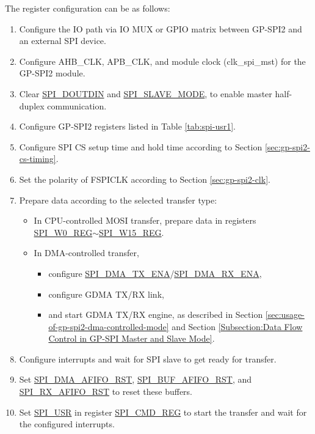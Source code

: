 \documentclass[main\_\_EN.tex]{subfiles}
\begin{document}
The register configuration can be as follows:
\begin{enumerate}
    \item Configure the IO path via IO MUX or GPIO matrix between GP-SPI2 and an external SPI device.
    \item Configure AHB\_CLK, APB\_CLK, and module clock (clk\_spi\_mst) for the GP-SPI2 module.
    \item Clear \hyperref[fielddesc:SPIDOUTDIN]{SPI\_DOUTDIN} and \hyperref[fielddesc:SPISLAVEMODE]{SPI\_SLAVE\_MODE}, to enable master half-duplex communication.
    \item Configure GP-SPI2 registers listed in Table \ref{tab:spi-usr1}.
    \item Configure SPI CS setup time and hold time according to Section \ref{sec:gp-spi2-cs-timing}.
    \item Set the polarity of FSPICLK according to Section \ref{sec:gp-spi2-clk}.
    \item Prepare data according to the selected transfer type:
    \begin{itemize}
        \item In CPU-controlled MOSI transfer, prepare data in registers \hyperref[regdesc:SPIW0REG]{SPI\_W0\_REG}$\sim$\hyperref[regdesc:SPIW15REG]{SPI\_W15\_REG}.
        \item In DMA-controlled transfer,
        \begin{itemize}
            \item configure \hyperref[fielddesc:SPIDMATXENA]{SPI\_DMA\_TX\_ENA}/\hyperref[fielddesc:SPIDMARXENA]{SPI\_DMA\_RX\_ENA},
            \item configure GDMA TX/RX link,
            \item and start GDMA TX/RX engine, as described in Section \ref{sec:usage-of-gp-spi2-dma-controlled-mode} and Section \ref{Subsection:Data Flow Control in GP-SPI Master and Slave Mode}.
        \end{itemize}
    \end{itemize}
    \item Configure interrupts and wait for SPI slave to get ready for transfer.
    \item Set \hyperref[fielddesc:SPIDMAAFIFORST]{SPI\_DMA\_AFIFO\_RST}, \hyperref[fielddesc:SPIBUFAFIFORST]{SPI\_BUF\_AFIFO\_RST}, and \hyperref[fielddesc:SPIRXAFIFORST]{SPI\_RX\_AFIFO\_RST} to reset these buffers.
    \item Set \hyperref[fielddesc:SPIUSR]{SPI\_USR} in register \hyperref[regdesc:SPICMDREG]{SPI\_CMD\_REG} to start the transfer and wait for the configured interrupts.
\end{enumerate}
\end{document}
